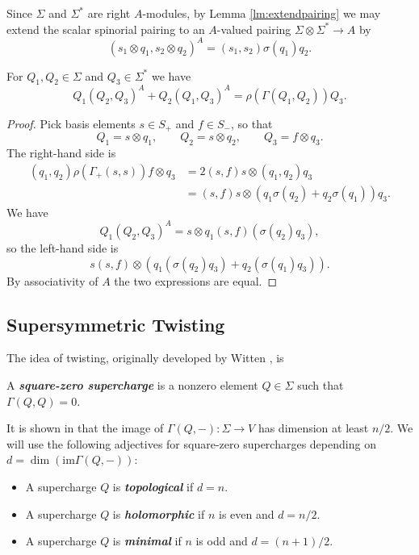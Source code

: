 \documentclass[10pt, oneside]{article}
\newcommand{\defterm}[1]{\textbf{\emph{#1}}}
\begin{document}
Since $\Sigma$ and $\Sigma^*$ are right $A$-modules, by Lemma \ref{lm:extendpairing} we may extend the scalar spinorial pairing to an $A$-valued pairing $\Sigma\otimes \Sigma^*\rightarrow A$ by
\[(s_1\otimes q_1, s_2\otimes q_2)^A = (s_1, s_2)\sigma(q_1) q_2.\]

\begin{thm}
For $Q_1, Q_2\in\Sigma$ and $Q_3\in\Sigma^*$ we have
\[Q_1(Q_2, Q_3)^A + Q_2(Q_1, Q_3)^A = \rho(\Gamma(Q_1, Q_2))Q_3.\]
\label{thm:2dmatter3psi}
\end{thm}
\begin{proof}
Pick basis elements $s\in S_+$ and $f\in S_-$, so that
\[Q_1 = s\otimes q_1,\qquad Q_2 = s\otimes q_2,\qquad Q_3 = f\otimes q_3.\]
The right-hand side is
\begin{align*}
(q_1, q_2) \rho(\Gamma_+(s, s)) f\otimes q_3 &= 2(s, f) s\otimes (q_1, q_2) q_3 \\
&= (s, f) s\otimes (q_1\sigma(q_2) + q_2\sigma(q_1)) q_3.
\end{align*}
We have
\[Q_1(Q_2, Q_3)^A = s\otimes q_1 (s, f) (\sigma(q_2)q_3),\]
so the left-hand side is
\[s(s, f)\otimes (q_1(\sigma(q_2) q_3) + q_2(\sigma(q_1)q_3)).\]
By associativity of $A$ the two expressions are equal.
\end{proof}

\subsection{Supersymmetric Twisting}
The idea of twisting, originally developed by Witten , is 

\begin{definition}
A \defterm{square-zero supercharge} is a nonzero element $Q\in\Sigma$ such that $\Gamma(Q, Q)=0$.
\end{definition}

It is shown in \cite[Proposition 3.25]{ElliottSafronov} that the image of $\Gamma(Q, -)\colon \Sigma\rightarrow V$ has dimension at least $n/2$. We will use the following adjectives for square-zero supercharges depending on $d=\dim(\mathrm{im}\Gamma(Q, -))$:
\begin{itemize}
\item A supercharge $Q$ is \defterm{topological} if $d = n$.

\item A supercharge $Q$ is \defterm{holomorphic} if $n$ is even and $d=n/2$.

\item A supercharge $Q$ is \defterm{minimal} if $n$ is odd and $d=(n+1)/2$.
\end{itemize}
\end{document}
